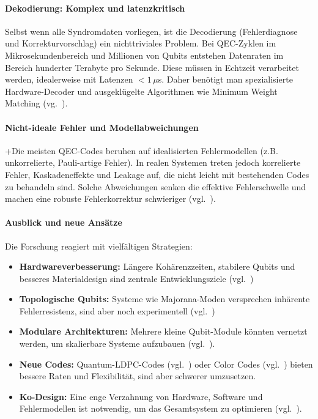 \paragraph{Dekodierung: Komplex und latenzkritisch}
Selbst wenn alle Syndromdaten vorliegen, ist die Decodierung (Fehlerdiagnose und Korrekturvorschlag) ein nichttriviales Problem. Bei QEC-Zyklen im Mikrosekundenbereich und Millionen von Qubits entstehen Datenraten im Bereich hunderter Terabyte pro Sekunde. Diese m\"ussen in Echtzeit verarbeitet werden, idealerweise mit Latenzen $<1\,\mu$s. Daher ben\"otigt man spezialisierte Hardware-Decoder und ausgekl\"ugelte Algorithmen wie Minimum Weight Matching (vg.~\cite[3-4]{wu_micro_2025}).

\paragraph{Nicht-ideale Fehler und Modellabweichungen}
+Die meisten QEC-Codes beruhen auf idealisierten Fehlermodellen (z.B. unkorrelierte, Pauli-artige Fehler). In realen Systemen treten jedoch korrelierte Fehler, Kaskadeneffekte und Leakage auf, die nicht leicht mit bestehenden Codes zu behandeln sind. Solche Abweichungen senken die effektive Fehlerschwelle und machen eine robuste Fehlerkorrektur schwieriger (vgl.~\cite[312]{terhal_quantum_2015}).

\paragraph{Ausblick und neue Ans\"atze}
Die Forschung reagiert mit vielf\"altigen Strategien:
\begin{itemize}
    \item \textbf{Hardwareverbesserung:} Längere Kohärenzzeiten, stabilere Qubits und besseres Materialdesign sind zentrale Entwicklungsziele (vgl.~\cite[309]{terhal_quantum_2015})
    \item \textbf{Topologische Qubits:} Systeme wie Majorana-Moden versprechen inhärente Fehlerresistenz, sind aber noch experimentell (vgl.~\cite[320]{terhal_quantum_2015})
    \item \textbf{Modulare Architekturen:} Mehrere kleine Qubit-Module könnten vernetzt werden, um skalierbare Systeme aufzubauen (vgl.~\cite[332-333]{terhal_quantum_2015}).
    \item \textbf{Neue Codes:} Quantum-LDPC-Codes (vgl.~\cite[342]{terhal_quantum_2015}) oder Color Codes (vgl.~\cite[327]{terhal_quantum_2015}) bieten bessere Raten und Flexibilität, sind aber schwerer umzusetzen.
    \item \textbf{Ko-Design:} Eine enge Verzahnung von Hardware, Software und Fehlermodellen ist notwendig, um das Gesamtsystem zu optimieren (vgl.~\cite[308]{terhal_quantum_2015}).
\end{itemize}

